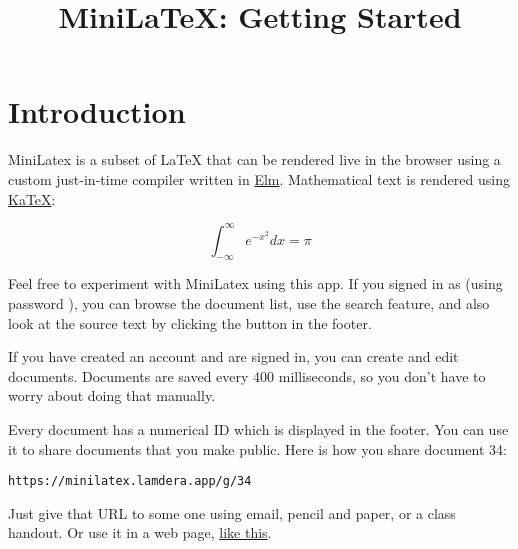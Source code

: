 

\title{MiniLaTeX: Getting Started}


\begin{mathmacro}
\newcommand{\bt}[1]{\bf{#1}}
\newcommand{\mca}[0]{\mathcal{A}}
\end{mathmacro}

\begin{textmacro}
\newcommand{\boss}{Phineas Fogg}
\newcommand{\hello}[1]{Hello \strong{#1}!}
\newcommand{\reverseconcat}[3]{#3#2#1}
\end{textmacro}

\maketitle


\tableofcontents

\section{Introduction}



MiniLatex is a subset of LaTeX that can be
rendered live in the browser using a custom just-in-time compiler written in \href{https://elm-lang.org}{Elm}.
Mathematical text is rendered using \href{https://katex.org}{KaTeX}:

$$
\int_{-\infty}^\infty e^{-x^2} dx = \pi
$$



 Feel free to
experiment with MiniLatex using this app.  If you signed in as
 (using password ), you can browse
the document list, use the search feature, and also look at
the source text by clicking the  button in the footer.


 If you have created an account and  are signed in, you can create and edit documents.  Documents are saved every 400 milliseconds, so you don't have to worry about doing that manually.

 Every document has a numerical ID which is displayed in the footer.  You can use it to share documents that you make public. Here is how you share document 34:

\begin{verbatim}
https://minilatex.lamdera.app/g/34
\end{verbatim}

Just give that URL to some one using email, pencil and paper, or a class handout.  Or use it in a web page, \href{https://minilatex.lamdera.app/g/34}{like this}.

